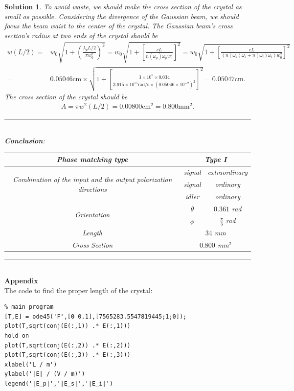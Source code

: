 \documentclass[UTF8,10pt,a4paper]{article}
\theoremstyle{Problem}
\theoremstyle{Solution}
\newtheorem*{sol}{Solution}
\begin{document}
\begin{sol}
    To avoid waste, we should make the cross section of the crystal as small as possible. Considering the divergence of the Gaussian beam, we should focus the beam waist to the center of the crystal. The Gaussian beam's cross section's radius at two ends of the crystal should be
    \begin{align}
        \nonumber w(L/2)=&w_0\sqrt{1+\left(\frac{\lambda_pL/2}{\pi w_0^2}\right)^2}=w_0\sqrt{1+\left[\frac{cL}{n(\omega_p)\omega_pw_0^2}\right]^2}=w_0\sqrt{1+\left[\frac{cL}{(n(\omega_s)\omega_s+n(\omega_i)\omega_i)w_0^2}\right]^2}\\
        =&0.05046\text{cm}\times\sqrt{1+\left[\frac{3\times 10^8\times 0.034}{3.915\times 10^{15}\text{rad}/\text{s}\times(0.05046\times 10^{-2})^2}\right]^2}=0.05047\text{cm}.
    \end{align}
    The cross section of the crystal should be
    \begin{align}
        A=\pi w^2(L/2)=0.00800\text{cm}^2=0.800\text{mm}^2.
    \end{align}


    \newpage
    \noindent\rule{\columnwidth}{1pt}\\
    \textbf{Conclusion}:
    \begin{table}[h]
        \centering
        \begin{tabular}{|c|c|c|}
            \hline
            Phase matching type & \multicolumn{2}{c|}{Type I} \\ \hline
            \multirow{3}{*}{Combination of the input and the output polarization directions} & signal & extraordinary \\ \cline{2-3} 
             & signal & ordinary \\ \cline{2-3} 
             & idler & ordinary \\ \hline
            \multirow{2}{*}{Orientation} & $\theta$ & $0.361$ rad \\ \cline{2-3} 
             & $\phi$ & $\frac{\pi}{3}$ rad \\ \hline
            Length & \multicolumn{2}{c|}{$34$ mm} \\ \hline
            Cross Section & \multicolumn{2}{c|}{$0.800$ mm$^2$} \\ \hline
        \end{tabular}
    \end{table}
\end{sol}

\noindent\rule{\columnwidth}{1pt}\\
\textbf{Appendix}\\
The code to find the proper length of the crystal:
\begin{lstlisting}
% main program
[T,E] = ode45('F',[0 0.1],[7565283.5547819445;1;0]);
plot(T,sqrt(conj(E(:,1)) .* E(:,1)))
hold on
plot(T,sqrt(conj(E(:,2)) .* E(:,2)))
plot(T,sqrt(conj(E(:,3)) .* E(:,3)))
xlabel('L / m')
ylabel('|E| / (V / m)')
legend('|E_p|','|E_s|','|E_i|')
\end{lstlisting}
\end{document}
